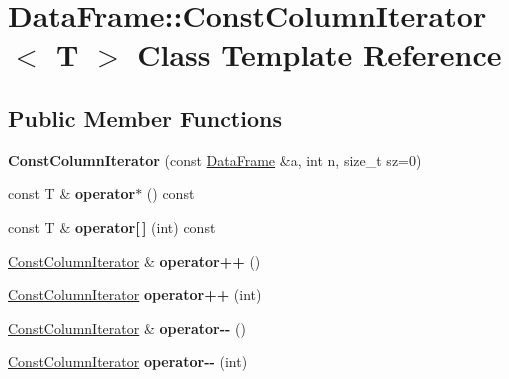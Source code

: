 \hypertarget{classDataFrame_1_1ConstColumnIterator}{}\section{Data\+Frame\+:\+:Const\+Column\+Iterator$<$ T $>$ Class Template Reference}
\label{classDataFrame_1_1ConstColumnIterator}
\subsection*{Public Member Functions}
\begin{DoxyCompactItemize}
\item 
\mbox{\label{classDataFrame_1_1ConstColumnIterator_aae947ed7773b4dc75bab9572f5dec9ed}} 
{\bfseries Const\+Column\+Iterator} (const \hyperlink{classDataFrame}{Data\+Frame} \&a, int n, size\+\_\+t sz=0)
\item 
\mbox{\label{classDataFrame_1_1ConstColumnIterator_a3566447dd4686873cc56d0c9f9759755}} 
const T \& {\bfseries operator$\ast$} () const
\item 
\mbox{\label{classDataFrame_1_1ConstColumnIterator_a9fe179b232291b10ace5e39c9512b89a}} 
const T \& {\bfseries operator\mbox{[}$\,$\mbox{]}} (int) const
\item 
\mbox{\label{classDataFrame_1_1ConstColumnIterator_a01c8e31cd720cd852fc1045044d68865}} 
\hyperlink{classDataFrame_1_1ConstColumnIterator}{Const\+Column\+Iterator} \& {\bfseries operator++} ()
\item 
\mbox{\label{classDataFrame_1_1ConstColumnIterator_a19deac4cc676f2b54f93df10a3d89d31}} 
\hyperlink{classDataFrame_1_1ConstColumnIterator}{Const\+Column\+Iterator} {\bfseries operator++} (int)
\item 
\mbox{\label{classDataFrame_1_1ConstColumnIterator_ad9a73b33852783c9977ca6abb2db493e}} 
\hyperlink{classDataFrame_1_1ConstColumnIterator}{Const\+Column\+Iterator} \& {\bfseries operator-\/-\/} ()
\item 
\mbox{\label{classDataFrame_1_1ConstColumnIterator_a5ee96a13f1a26a51514784435d35e86c}} 
\hyperlink{classDataFrame_1_1ConstColumnIterator}{Const\+Column\+Iterator} {\bfseries operator-\/-\/} (int)
\end{DoxyCompactItemize}
